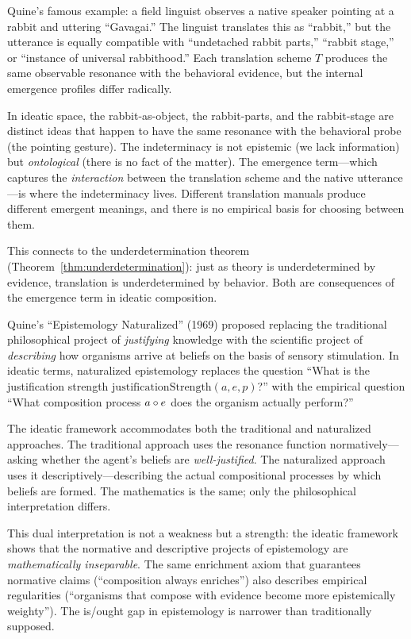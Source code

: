 \begin{interpretation}
Quine's famous example: a field linguist observes a native speaker pointing at a
rabbit and uttering ``Gavagai.'' The linguist translates this as ``rabbit,'' but
the utterance is equally compatible with ``undetached rabbit parts,'' ``rabbit
stage,'' or ``instance of universal rabbithood.'' Each translation scheme $T$
produces the same observable resonance with the behavioral evidence, but the
internal emergence profiles differ radically.

In ideatic space, the rabbit-as-object, the rabbit-parts, and the rabbit-stage
are distinct ideas that happen to have the same resonance with the behavioral
probe (the pointing gesture). The indeterminacy is not epistemic (we lack
information) but \emph{ontological} (there is no fact of the matter). The
emergence term---which captures the \emph{interaction} between the translation
scheme and the native utterance---is where the indeterminacy lives. Different
translation manuals produce different emergent meanings, and there is no
empirical basis for choosing between them.

This connects to the underdetermination theorem (Theorem~\ref{thm:underdetermination}):
just as theory is underdetermined by evidence, translation is underdetermined by
behavior. Both are consequences of the emergence term in ideatic composition.
\end{interpretation}

\begin{remark}
Quine's ``Epistemology Naturalized'' (1969) proposed replacing the traditional
philosophical project of \emph{justifying} knowledge with the scientific project
of \emph{describing} how organisms arrive at beliefs on the basis of sensory
stimulation. In ideatic terms, naturalized epistemology replaces the question
``What is the justification strength $\mathrm{justificationStrength}(a, e, p)$?''
with the empirical question ``What composition process $a \circ e$ does the
organism actually perform?''

The ideatic framework accommodates both the traditional and naturalized approaches.
The traditional approach uses the resonance function normatively---asking whether
the agent's beliefs are \emph{well-justified}. The naturalized approach uses it
descriptively---describing the actual compositional processes by which beliefs are
formed. The mathematics is the same; only the philosophical interpretation differs.

This dual interpretation is not a weakness but a strength: the ideatic framework
shows that the normative and descriptive projects of epistemology are
\emph{mathematically inseparable}. The same enrichment axiom that guarantees
normative claims (``composition always enriches'') also describes empirical
regularities (``organisms that compose with evidence become more
epistemically weighty''). The is/ought gap in epistemology is narrower than
traditionally supposed.
\end{remark}

